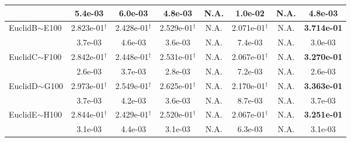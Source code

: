 {\begin{longtable}[c]{lccccccc}
                                            & 5.4e-03            & 6.0e-03            & 4.8e-03            & N.A.               & 1.0e-02            & N.A.                            & 4.8e-03            \\
    \midrule
    EuclidB$\sim$E100         & 2.823e-01$^{\dag}$ & 2.428e-01$^{\dag}$ & 2.529e-01$^{\dag}$ & N.A.               & 2.071e-01$^{\dag}$ & N.A.                 & \textbf{3.714e-01} \\
                                            & 3.7e-03            & 4.6e-03            & 3.6e-03            & N.A.               & 7.4e-03            & N.A.                            & 3.0e-03            \\
    \midrule
    EuclidC$\sim$F100       & 2.842e-01$^{\dag}$ & 2.448e-01$^{\dag}$ & 2.531e-01$^{\dag}$ & N.A.               & 2.067e-01$^{\dag}$ & N.A.                 & \textbf{3.270e-01} \\
                                            & 2.6e-03            & 3.7e-03            & 2.8e-03            & N.A.               & 7.2e-03            & N.A.                           & 2.6e-03            \\
    \midrule
    EuclidD$\sim$G100       & 2.973e-01$^{\dag}$ & 2.549e-01$^{\dag}$ & 2.625e-01$^{\dag}$ & N.A.               & 2.170e-01$^{\dag}$ & N.A.                  & \textbf{3.363e-01} \\
                                            & 3.7e-03            & 4.2e-03            & 3.6e-03            & N.A.               & 8.7e-03            & N.A.                             & 3.7e-03            \\
    \midrule
    EuclidE$\sim$H100        & 2.844e-01$^{\dag}$ & 2.429e-01$^{\dag}$ & 2.520e-01$^{\dag}$ & N.A.               & 2.067e-01$^{\dag}$ & N.A.                  & \textbf{3.251e-01} \\
                                            & 3.1e-03            & 4.4e-03            & 3.1e-03            & N.A.               & 6.3e-03            & N.A.                            & 3.1e-03            \\
    \midrule


\end{longtable}}

